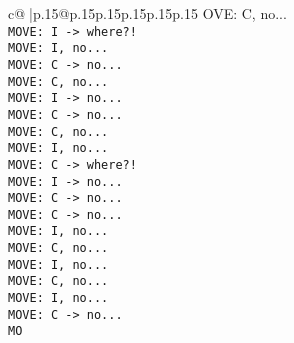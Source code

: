 \documentclass{article}
\begin{document}
{\begin{supertabular}{c@{$\;$}|p{.15\linewidth}@{}p{.15\linewidth}p{.15\linewidth}p{.15\linewidth}p{.15\linewidth}p{.15\linewidth}}
{{{OVE: C, no...\\ \tt  MOVE: I -> where?!\\ \tt  MOVE: I, no...\\ \tt  MOVE: C -> no...\\ \tt  MOVE: C, no...\\ \tt  MOVE: I -> no...\\ \tt  MOVE: C -> no...\\ \tt  MOVE: C, no...\\ \tt  MOVE: I, no...\\ \tt  MOVE: C -> where?!\\ \tt  MOVE: I -> no...\\ \tt  MOVE: C -> no...\\ \tt  MOVE: C -> no...\\ \tt  MOVE: I, no...\\ \tt  MOVE: C, no...\\ \tt  MOVE: I, no...\\ \tt  MOVE: C, no...\\ \tt  MOVE: I, no...\\ \tt  MOVE: C -> no...\\ \tt  MO}}}
\end{supertabular}}
\end{document}
